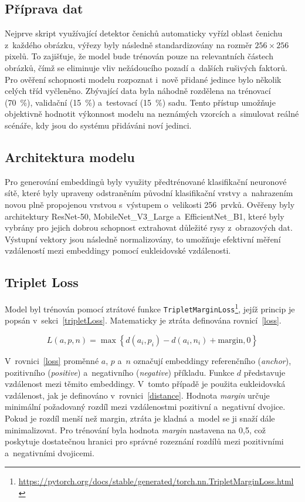 \subsection*{Příprava dat}
 Nejprve skript využívající detektor čenichů automaticky vyřízl oblast čenichu z~každého obrázku, výřezy byly následně standardizovány na rozměr \(256 \times 256\) pixelů. To zajišťuje, že model bude trénován pouze na relevantních částech obrázků, čímž se eliminuje vliv nežádoucího pozadí a~dalších rušivých faktorů. Pro ověření schopnosti modelu rozpoznat i~nově přidané jedince bylo několik celých tříd vyčleněno. Zbývající data byla náhodně rozdělena na trénovací (70~\%), validační (15~\%) a~testovací (15~\%) sadu. Tento přístup umožňuje objektivně hodnotit výkonnost modelu na neznámých vzorcích a~simulovat reálné scénáře, kdy jsou do systému přidáváni noví jedinci.

\subsection*{Architektura modelu}
Pro generování embeddingů byly využity předtrénované klasifikační neuronové sítě, které byly upraveny odstraněním původní klasifikační vrstvy a~nahrazením novou plně propojenou vrstvou s~výstupem o~velikosti 256~prvků. Ověřeny byly architektury ResNet-50, MobileNet\_V3\_Large a~EfficientNet\_B1, které byly vybrány pro jejich dobrou schopnost extrahovat důležité rysy z~obrazových dat. Výstupní vektory jsou následně normalizovány, to umožňuje efektivní měření vzdáleností mezi embeddingy pomocí eukleidovské vzdálenosti.


\subsection*{Triplet Loss}

Model byl trénován pomocí ztrátové funkce \texttt{TripletMarginLoss}\footnote{\url{https://pytorch.org/docs/stable/generated/torch.nn.TripletMarginLoss.html}}, jejíž princip je popsán v~sekci~\ref{tripletLoss}. 
Matematicky je ztráta definována rovnicí~\ref{loss}.

\begin{equation}
	L(a,p,n) = \max \left\{ d(a_i, p_i) - d(a_i, n_i) + \text{margin}, 0 \right\}
	\label{loss}
\end{equation}

V~rovnici~\ref{loss} proměnné $a$, $p$ a~$n$ označují embeddingy referenčního (\textit{anchor}), pozitivního (\textit{positive}) a~negativního (\textit{negative}) příkladu. Funkce $d$ představuje vzdálenost mezi těmito embeddingy. V~tomto případě je použita eukleidovská vzdálenost, jak je definováno v~rovnici~\ref{distance}. Hodnota \textit{margin} určuje minimální požadovaný rozdíl mezi vzdálenostmi pozitivní a~negativní dvojice. Pokud je rozdíl menší než margin, ztráta je kladná a~model se ji snaží dále minimalizovat. Pro trénování byla hodnota \textit{margin} nastavena na 0,5, což poskytuje dostatečnou hranici pro správné rozeznání rozdílů mezi pozitivními a~negativními dvojicemi.

